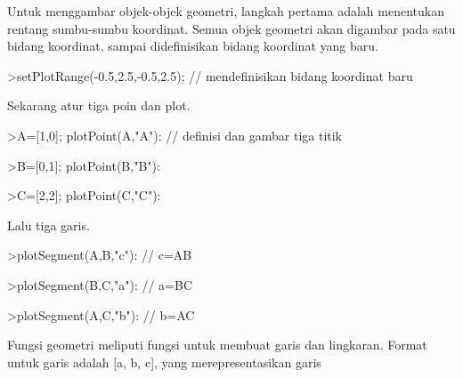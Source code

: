 \documentclass[12pt,Times new roman,letterpaper]{book}
\begin{document}
\begin{eulernootebook}
\begin{eulercomment}
\begin{eulercomment}
\begin{eulernootebook}
\begin{eulercomment}
\begin{eulercomment}
\begin{eulercomment}
\begin{eulercomment}
\begin{eulercomment}
\begin{eulercomment}
\begin{eulernotebook}
\begin{eulercomment}
\begin{eulercomment}
\end{eulercomment}
\begin{eulercomment}
Untuk menggambar objek-objek geometri, langkah pertama adalah menentukan rentang sumbu-sumbu
koordinat. Semua objek geometri akan digambar pada satu bidang koordinat, sampai didefinisikan
bidang koordinat yang baru.
\end{eulercomment}
\begin{eulerprompt}
>setPlotRange(-0.5,2.5,-0.5,2.5); // mendefinisikan bidang koordinat baru 
\end{eulerprompt}
\begin{eulercomment}
Sekarang atur tiga poin dan plot.
\end{eulercomment}
\begin{eulerprompt}
>A=[1,0]; plotPoint(A,"A"): // definisi dan gambar tiga titik
\end{eulerprompt}
\begin{eulerprompt}
>B=[0,1]; plotPoint(B,"B"):
\end{eulerprompt}
\begin{eulerprompt}
>C=[2,2]; plotPoint(C,"C"):
\end{eulerprompt}
\begin{eulercomment}
Lalu tiga garis.
\end{eulercomment}
\begin{eulerprompt}
>plotSegment(A,B,"c"): // c=AB
\end{eulerprompt}
\begin{eulerprompt}
>plotSegment(B,C,"a"): // a=BC
\end{eulerprompt}
\begin{eulerprompt}
>plotSegment(A,C,"b"): // b=AC
\end{eulerprompt}
\begin{eulercomment}
Fungsi geometri meliputi fungsi untuk membuat garis dan lingkaran.
Format untuk garis adalah [a, b, c], yang merepresentasikan garis

\end{eulercomment}
\end{eulercomment}
\end{eulernotebook}
\end{eulercomment}
\end{eulercomment}
\end{eulercomment}
\end{eulercomment}
\end{eulercomment}
\end{eulercomment}
\end{eulernootebook}
\end{eulercomment}
\end{eulercomment}
\end{eulernootebook}
\end{document}
